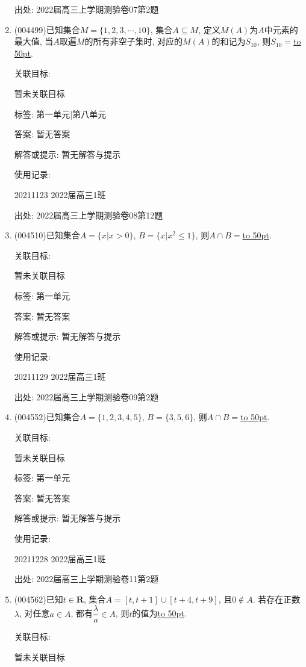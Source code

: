 \documentclass[10pt,a4paper]{article}
\newcommand{\blank}[1]{\underline{\hbox to #1pt{}}}
\begin{document}
\begin{enumerate}[1.]
出处: 2022届高三上学期测验卷07第2题
\item { (004499)}已知集合$M=\{1,2,3,\cdots,10\}$, 集合$A\subseteq M$, 定义$M(A)$为$A$中元素的最大值, 当$A$取遍$M$的所有非空子集时, 对应的$M(A)$的和记为$S_{10}$, 则$S_{10}=$\blank{50}.


关联目标:

暂未关联目标



标签: 第一单元|第八单元

答案: 暂无答案

解答或提示: 暂无解答与提示

使用记录:

20211123	2022届高三1班	


出处: 2022届高三上学期测验卷08第12题
\item { (004510)}已知集合$A=\{x|x>0\}$, $B=\{x|x^2\le 1\}$, 则$A\cap B=$\blank{50}.


关联目标:

暂未关联目标



标签: 第一单元

答案: 暂无答案

解答或提示: 暂无解答与提示

使用记录:

20211129	2022届高三1班	


出处: 2022届高三上学期测验卷09第2题
\item { (004552)}已知集合$A=\{1,2,3,4,5\}$, $B=\{3,5,6\}$, 则$A\cap B=$\blank{50}.


关联目标:

暂未关联目标



标签: 第一单元

答案: 暂无答案

解答或提示: 暂无解答与提示

使用记录:

20211228	2022届高三1班	


出处: 2022届高三上学期测验卷11第2题
\item { (004562)}已知$t\in \mathbf{R}$, 集合$A=[t,t+1]\cup [t+4,t+9]$, 且$0\not\in A$. 若存在正数$\lambda$, 对任意$a\in A$, 都有$\dfrac{\lambda}a\in A$, 则$t$的值为\blank{50}.


关联目标:

暂未关联目标




\end{enumerate}
\end{document}
